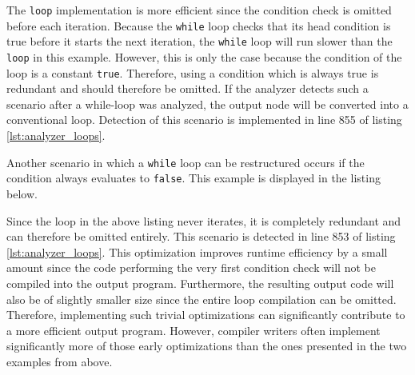 The \texttt{loop} implementation is more efficient since the condition check is omitted before each iteration.
Because the \texttt{while} loop checks that its head condition is true before it starts the next iteration,
the \texttt{while} loop will run slower than the \texttt{loop} in this example.
However, this is only the case because the condition of the loop is a constant \texttt{true}.
Therefore, using a condition which is always true is redundant and should therefore be omitted.
If the analyzer detects such a scenario after a while-loop was analyzed, the output node will be converted into a conventional loop.
Detection of this scenario is implemented in line 855 of listing \ref{lst:analyzer_loops}.


Another scenario in which a \texttt{while} loop can be restructured occurs if the condition always evaluates to \texttt{false}.
This example is displayed in the listing below.


Since the loop in the above listing never iterates, it is completely redundant and can therefore be omitted entirely.
This scenario is detected in line 853 of listing \ref{lst:analyzer_loops}.
This optimization improves runtime efficiency by a small amount since the code performing the very first condition check will not be compiled into the output program.
Furthermore, the resulting output code will also be of slightly smaller size since the entire loop compilation can be omitted.
Therefore, implementing such trivial optimizations can significantly contribute to a more efficient output program.
However, compiler writers often implement significantly more of those early optimizations than the ones presented in the two examples from above.
